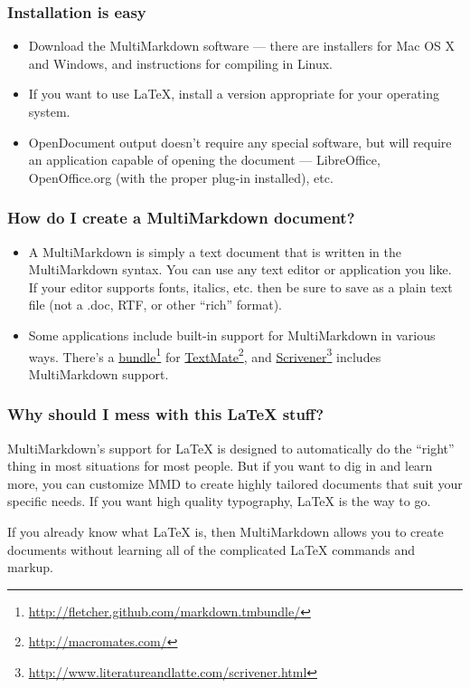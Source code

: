 \documentclass[ignorenonframetext,12pt,aspectratio=169]{beamer}
\begin{document}
\begin{frame}[fragile]
\frametitle{Installation is easy}
\label{installationiseasy}

\begin{itemize}
\item Download the MultiMarkdown software --- there are installers for Mac OS X
and Windows, and instructions for compiling in Linux.
\item If you want to use LaTeX, install a version appropriate for your operating
system.
\item OpenDocument output doesn't require any special software, but will require
an application capable of opening the document --- LibreOffice,
OpenOffice.org (with the proper plug-in installed), etc.
\end{itemize}

\end{frame}

\begin{frame}[fragile]
\frametitle{How do I create a MultiMarkdown document?}
\label{howdoicreateamultimarkdowndocument}

\begin{itemize}
\item A MultiMarkdown is simply a text document that is written in the
MultiMarkdown syntax. You can use any text editor or application you like.
If your editor supports fonts, italics, etc. then be sure to save as a plain
text file (not a .doc, RTF, or other ``rich'' format).
\item Some applications include built-in support for MultiMarkdown in various
ways. There's a \href{http://fletcher.github.com/markdown.tmbundle/}{bundle}\footnote{\href{http://fletcher.github.com/markdown.tmbundle/}{http://fletcher.github.com/markdown.tmbundle/}} for \href{http://macromates.com/}{TextMate}\footnote{\href{http://macromates.com/}{http://macromates.com/}}, and \href{http://www.literatureandlatte.com/scrivener.html}{Scrivener}\footnote{\href{http://www.literatureandlatte.com/scrivener.html}{http://www.literatureandlatte.com/scrivener.html}} includes
MultiMarkdown support.
\end{itemize}

\end{frame}

\begin{frame}[fragile]
\frametitle{Why should I mess with this LaTeX stuff?}
\label{whyshouldimesswiththislatexstuff}

MultiMarkdown's support for LaTeX is designed to automatically do the ``right''
thing in most situations for most people. But if you want to dig in and learn
more, you can customize MMD to create highly tailored documents that suit your
specific needs. If you want high quality typography, LaTeX is the way to go.

If you already know what LaTeX is, then MultiMarkdown allows you to create
documents without learning all of the complicated LaTeX commands and markup.

\end{frame}
\end{document}
